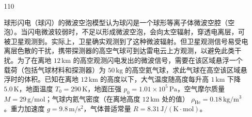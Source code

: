 \begin{problem}[2019年第36届全国中学生物理竞赛复赛][雷电云与闪电物理]{110}
\begin{subproblem}
\end{subproblem}
\begin{subproblem}
球形闪电（球闪）的微波空泡模型认为球闪是一个球形等离子体微波空腔（空泡）。当闪电微波较弱时，不足以形成微波空泡，会向太空辐射，穿透电离层，可被卫星观测到。实际上，卫星确实观测到了这种微波辐射。但卫星观测信号易受电离层色散的干扰，携带探测器的高空气球可到达雷电云上方观测，以避免此类干扰。为了在离地 $12\,\mathrm{km}$ 的高空观测闪电发出的微波信号，需要在该区域悬浮一个载荷（包括气球材料和探测器）为 $50\,\mathrm{kg}$ 的高空氦气球，求此气球在高空该区域悬浮时的体积。已知在离地 $12\,\mathrm{km}$ 的高度以下，大气温度随高度每升高 $1\,\mathrm{km}$ 下降 $5.0\,\mathrm{K}$，地面温度 $T_{0}=290\,\mathrm{K}$，地面压强 $p_{0}=1.01\times10^{5}\,\mathrm{Pa}$，空气摩尔质量 $M=29\,\mathrm{g/mol}$；气球内氦气密度（在离地高度 $12\,\mathrm{km}$ 处的值） $\rho_{\mathrm{He}}=0.18\,\mathrm{kg/m^{3}}$。重力加速度 $g=9.8\,\mathrm{m/s^{2}}$，气体普适常量 $R=8.31\,\mathrm{J/(K\cdot mol)}$。
\end{subproblem}
\end{problem}